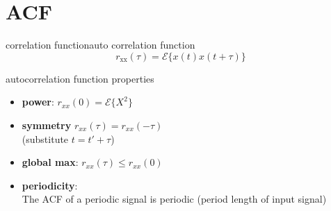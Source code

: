 \section{ACF}
\begin{frame}{correlation function}{auto correlation function}
		\begin{equation*}
			r_\mathrm{xx}(\tau)=\mathcal{E}\lbrace x(t)x(t+\tau)\rbrace  
		\end{equation*}

		\pause
		\begin{block}{autocorrelation function properties}
			\begin{itemize}
				\item	\textbf{power}: $r_{xx}(0) = 	\mathcal{E}\lbrace X^2\rbrace $ 

				\smallskip
				\item<2->	\textbf{symmetry} $r_{xx}(\tau)=r_{xx}(-\tau)$\\
					(substitute $t=t'+\tau$)

				\smallskip
                \item<3->	\textbf{global max}: $r_{xx}(\tau)\leq r_{xx}(0)$ 

				\smallskip
				\item<4->	\textbf{periodicity}:\\
					The {ACF} of a periodic signal is periodic (period length of input signal)

			\end{itemize}	
		\end{block}
\end{frame}	

